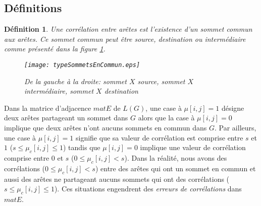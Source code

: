 \documentclass[onecolumn, 12pt]{book}
\newtheorem{definition}{D\'efinition}
\begin{document}
\subsection{D\'efinitions}

\begin{definition}
Une corr\'elation entre ar\^etes est l'existence d'un sommet commun aux ar\^etes. 
Ce sommet commun peut \^etre source, destination ou interm\'ediaire comme pr\'esent\'e dans la figure \ref{typeSommetEnCommun}.
\begin{figure}[htb!] 
\centering
\texttt{[image: typeSommetsEnCommun.eps]}
\caption{De la gauche \`a la droite: sommet $X$ source, sommet $X$ interm\'ediaire, sommet $X$ destination}
\label{typeSommetEnCommun} 
\end{figure}
\end{definition}
Dans la matrice d'adjacence $matE$ de $L(G)$, une case \`a $\mu[i,j] = 1$ d\'esigne deux ar\^etes partageant un sommet dans $G$ alors que la case \`a $\mu[i,j] = 0$ implique que deux ar\^etes n'ont aucuns sommets en commun dans $G$. 
\newline
Par ailleurs, une case \`a $\mu[i,j] = 1$ signifie que sa valeur de corr\'elation  est comprise entre $s$ et $1$ ($s \le \mu_c[i,j] \le 1$) tandis que $\mu[i,j] = 0$ implique une valeur de corr\'elation comprise entre $0$ et $s$ ($0 \le \mu_c[i,j] < s$). 
Dans la r\'ealit\'e, nous avons des corr\'elations ($0 \le \mu_c[i,j] < s$)  entre des ar\^etes qui ont un sommet en commun et aussi des ar\^etes ne partageant aucuns sommets qui ont des corr\'elations  ($s \le \mu_c[i,j] \le 1$). Ces situations engendrent des {\em erreurs de corr\'elations} dans $matE$.
\end{document}
